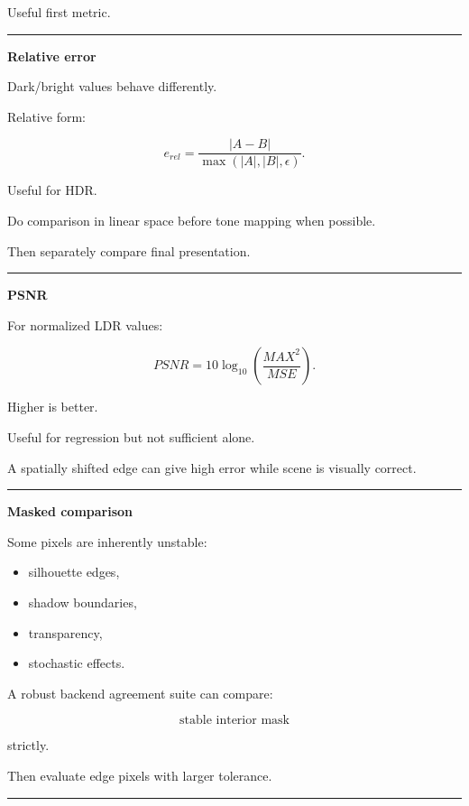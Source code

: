 Useful first metric.

\begin{center}\rule{0.5\linewidth}{0.5pt}\end{center}

\textbf{Relative error}

Dark/bright values behave differently.

Relative form:

\[
e_{rel}
=
\frac{
|A-B|
}{
\max(|A|,|B|,\epsilon)
}.
\]

Useful for HDR.

Do comparison in linear space before tone mapping when possible.

Then separately compare final presentation.

\begin{center}\rule{0.5\linewidth}{0.5pt}\end{center}

\textbf{PSNR}

For normalized LDR values:

\[
PSNR=
10
\log_{10}
\left(
\frac{MAX^2}{MSE}
\right).
\]

Higher is better.

Useful for regression but not sufficient alone.

A spatially shifted edge can give high error while scene is visually correct.

\begin{center}\rule{0.5\linewidth}{0.5pt}\end{center}

\textbf{Masked comparison}

Some pixels are inherently unstable:

\begin{itemize}
\tightlist
\item
  silhouette edges,
\item
  shadow boundaries,
\item
  transparency,
\item
  stochastic effects.
\end{itemize}

A robust backend agreement suite can compare:

\[
\text{stable interior mask}
\]

strictly.

Then evaluate edge pixels with larger tolerance.

\begin{center}\rule{0.5\linewidth}{0.5pt}\end{center}


